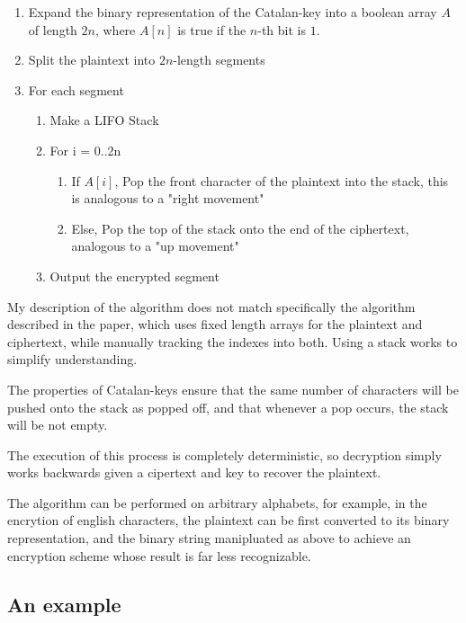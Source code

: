 \documentclass[12pt]{article} %
\begin{document}
\begin{enumerate}
    \item Expand the binary representation of the Catalan-key into a boolean array $A$ of length $2n$, where $A[n]$ is true if the $n$-th bit is $1$.
    \item Split the plaintext into $2n$-length segments
    \item For each segment \begin{enumerate}
            \item Make a LIFO Stack
            \item For i = 0..2n \begin{enumerate}
                    \item If $A[i]$, Pop the front character of the plaintext into the stack, this is analogous to a "right movement"
                    \item Else, Pop the top of the stack onto the end of the ciphertext, analogous to a "up movement"
            \end{enumerate}
        \item Output the encrypted segment
    \end{enumerate}
\end{enumerate}

My description of the algorithm does not match specifically the algorithm described in the paper, which uses fixed length arrays for the plaintext and ciphertext, while manually tracking the indexes into both.  Using a stack works to simplify understanding.

The properties of Catalan-keys ensure that the same number of characters will be pushed onto the stack as popped off, and that whenever a pop occurs, the stack will be not empty.

The execution of this process is completely deterministic, so decryption simply works backwards given a cipertext and key to recover the plaintext.

The algorithm can be performed on arbitrary alphabets, for example, in the encrytion of english characters, the plaintext can be first converted to its binary representation, and the binary string manipluated as above to achieve an encryption scheme whose result is far less recognizable.

\pagebreak

\subsection{An example}
\end{document}
